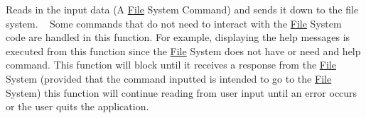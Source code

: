 Reads in the input data (A \mbox{\hyperlink{class_file}{File}} System Command) and sends it down to the file system. ~\newline
Some commands that do not need to interact with the \mbox{\hyperlink{class_file}{File}} System code are handled in this function. For example, displaying the \textquotesingle{}help\textquotesingle{} messages is executed from this function since the \mbox{\hyperlink{class_file}{File}} System does not have or need and \textquotesingle{}help\textquotesingle{} command. This function will block until it receives a response from the \mbox{\hyperlink{class_file}{File}} System (provided that the command inputted is intended to go to the \mbox{\hyperlink{class_file}{File}} System) this function will continue reading from user input until an error occurs or the user quits the application.

